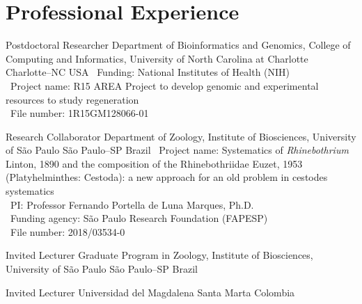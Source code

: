 
\section{Professional Experience}

	{Postdoctoral Researcher}
	{Department of Bioinformatics and Genomics, College of Computing and Informatics, University of North Carolina at Charlotte}
	{Charlotte--NC}
	{USA}
	{
		\textbullet~Funding: National Institutes of Health (NIH)\\
		\textbullet~Project name: R15 AREA Project to develop genomic and experimental resources to study regeneration\\
		\textbullet~File number: 1R15GM128066-01
	}

	{Research Collaborator}
	{Department of Zoology, Institute of Biosciences, University of São Paulo}
	{São Paulo--SP}
	{Brazil}
	{
		\textbullet~Project name: Systematics of \emph{Rhinebothrium} Linton, 1890 and the composition of the Rhinebothriidae Euzet, 1953 (Platyhelminthes: Cestoda): a new approach for an old problem in cestodes systematics\\
		\textbullet~PI: Professor Fernando Portella de Luna Marques, Ph.D.\\
		\textbullet~Funding agency: São Paulo Research Foundation (FAPESP)\\
		\textbullet~File number: 2018/03534-0
	}

	{Invited Lecturer}
	{Graduate Program in Zoology, Institute of Biosciences, University of São Paulo}
	{São Paulo--SP}
	{Brazil}
	{}

	{Invited Lecturer}
	{Universidad del Magdalena}
	{Santa Marta}
	{Colombia}
	{}




